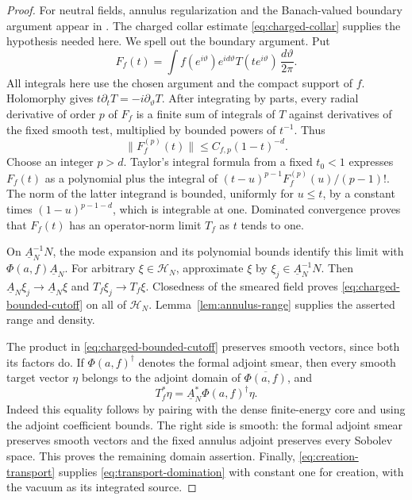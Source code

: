 \begin{proof}
For neutral fields, annulus regularization and the Banach-valued
boundary argument appear in \cite[Proposition~8.4 and Lemma~8.5]{HTVOA}.
The charged collar estimate \eqref{eq:charged-collar} supplies the
hypothesis needed here. We spell out the boundary argument.
Put
\[
 F_f(t)=\int f(e^{i\vartheta})e^{id\vartheta}
                         T(te^{i\vartheta})\,\frac{d\vartheta}{2\pi}.
\]
All integrals here use the chosen argument and the compact support of
$f$.  Holomorphy gives $t\partial_tT=-i\partial_\vartheta T$.
After integrating by parts, every radial derivative of order $p$ of
$F_f$ is a finite sum of integrals of $T$ against derivatives of the
fixed smooth test, multiplied by bounded powers of $t^{-1}$.
Thus
\[
 \|F_f^{(p)}(t)\|\leq C_{f,p}(1-t)^{-d}.
\]
Choose an integer $p>d$.  Taylor's integral formula from a fixed
$t_0<1$ expresses $F_f(t)$ as a polynomial plus the integral of
$(t-u)^{p-1}F_f^{(p)}(u)/(p-1)!$.
The norm of the latter integrand is bounded, uniformly for $u\leq t$,
by a constant times $(1-u)^{p-1-d}$, which is integrable at one.
Dominated convergence proves that $F_f(t)$ has an operator-norm limit
$T_f$ as $t$ tends to one.

On $\underline A_N^{-1}N$, the mode expansion and its polynomial bounds
identify this limit with $\Phi(a,f)\underline A_N$.
For arbitrary $\xi\in\mathcal H_N$, approximate $\xi$ by
$\xi_j\in\underline A_N^{-1}N$.  Then
$\underline A_N\xi_j\to\underline A_N\xi$ and
$T_f\xi_j\to T_f\xi$.  Closedness of the smeared field proves
\eqref{eq:charged-bounded-cutoff} on all of $\mathcal H_N$.
Lemma~\ref{lem:annulus-range} supplies the asserted range and density.

The product in \eqref{eq:charged-bounded-cutoff} preserves smooth
vectors, since both its factors do.  If $\Phi(a,f)^\dagger$ denotes
the formal adjoint smear, then every smooth target vector $\eta$
belongs to the adjoint domain of $\overline{\Phi(a,f)}$, and
\[
 T_f^*\eta=\underline A_N^*\Phi(a,f)^\dagger\eta.
\]
Indeed this equality follows by pairing with the dense finite-energy
core and using the adjoint coefficient bounds.  The right side is
smooth: the formal adjoint smear preserves smooth vectors and the
fixed annulus adjoint preserves every Sobolev space.  This proves the
remaining domain assertion.  Finally,
\eqref{eq:creation-transport} supplies
\eqref{eq:transport-domination} with constant one for creation, with
the vacuum as its integrated source.
\end{proof}
